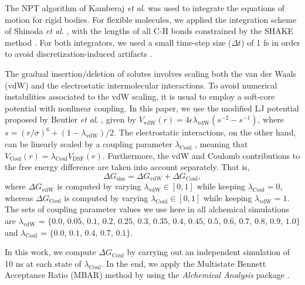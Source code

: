 \documentclass[3p,twocolumn]{elsarticle}
\begin{document}
The NPT algorithm of Kamberaj \textit{et al}. \cite{Kamberaj_2005} was used to integrate the equations of motion for rigid bodies.
For flexible molecules, we applied the integration scheme of Shinoda \textit{et al}. \cite{Shinoda2004}, with the lengths of all C-H bonds constrained by the SHAKE method \cite{Ryckaert1977}.
For both integrators, we used a small time-step size ($\Delta t$) of 1 fs in order to avoid discretization-induced artifacts \cite{Eastwood_2010, Silveira_2017}.

The gradual insertion/deletion of solutes involves scaling both the van der Waals (vdW) and the electrostatic intermolecular interactions.
To avoid numerical instabilities associated to the vdW scaling, it is usual to employ a soft-core potential with nonlinear coupling.
In this paper, we use the modified LJ potential proposed by Beutler \textit{et al}. \cite{Beutler_1994}, given by $V_\text{vdW}(r) = 4 \epsilon \lambda_\text{vdW} (s^{-2} - s^{-1})$, where $s = (r/\sigma)^6 + (1 - \lambda_\text{vdW})/2$.
The electrostatic interactions, on the other hand, can be linearly scaled by a coupling parameter $\lambda_\text{Coul}$ \cite{Naden_2015}, meaning that $V_\text{Coul}(r) = \lambda_\text{Coul} V_\text{DSF}(r)$.
Furthermore, the vdW and Coulomb contributions to the free energy difference are taken into account separately.
That is,
\begin{equation}
\Delta G_\text{sim} = \Delta G_\text{vdW} + \Delta G_\text{Coul},
\end{equation}
where $\Delta G_\text{vdW}$ is computed by varying $\lambda_\text{vdW} \in [0,1]$ while keeping $\lambda_\text{Coul} = 0$, whereas $\Delta G_\text{Coul}$ is computed by varying $\lambda_\text{Coul} \in [0,1]$ while keeping $\lambda_\text{vdW} = 1$.
The sets of coupling parameter values we use here in all alchemical simulations are $\lambda_{\text{vdW}}$ = $\{0.0$, $0.05$, $0.1$, $0.2$, $0.25$, $0.3$, $0.35$, $0.4$, $0.45$, $0.5$, $0.6$, $0.7$, $0.8$, $0.9$, $1.0\}$ and $\lambda_{\text{Coul}}$ = $\{0.0$, $0.1$, $0.4$, $0.7$, $0.1\}$.

In this work, we compute $\Delta G_\text{Coul}$ by carrying out an independent simulation of 10 ns at each state of $\lambda_{\text{Coul}}$.
In the end, we apply the Multistate Bennett Acceptance Ratio (MBAR) method \cite{Shirts_2008} by using the \textit{Alchemical Analysis} package \cite{Klimovich_2015}.
\end{document}
